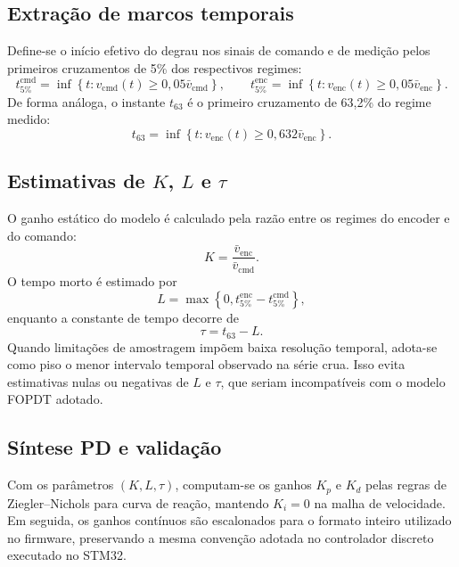 \subsection{Extra\c{c}\~ao de marcos temporais}

Define-se o in\'icio efetivo do degrau nos sinais de comando e de
medi\c{c}\~ao pelos primeiros cruzamentos de 5\% dos respectivos regimes:
\begin{equation}
    t^{\text{cmd}}_{5\%}
    =
    \inf \left\{ t : v_{\text{cmd}}(t) \ge 0{,}05 \bar{v}_{\text{cmd}} \right\},
    \qquad
    t^{\text{enc}}_{5\%}
    =
    \inf \left\{ t : v_{\text{enc}}(t) \ge 0{,}05 \bar{v}_{\text{enc}} \right\}.
\end{equation}
De forma an\'aloga, o instante $t_{63}$ \'e o primeiro cruzamento de
63,2\% do regime medido:
\begin{equation}
    t_{63}
    =
    \inf \left\{ t : v_{\text{enc}}(t) \ge 0{,}632 \bar{v}_{\text{enc}} \right\}.
\end{equation}

\subsection{Estimativas de $K$, $L$ e $\tau$}

O ganho est\'atico do modelo \'e calculado pela raz\~ao entre os regimes
do encoder e do comando:
\begin{equation}
    K = \frac{\bar{v}_{\text{enc}}}{\bar{v}_{\text{cmd}}}.
\end{equation}
O tempo morto \'e estimado por
\begin{equation}
    L = \max\left\{ 0, t^{\text{enc}}_{5\%} - t^{\text{cmd}}_{5\%} \right\},
\end{equation}
enquanto a constante de tempo decorre de
\begin{equation}
    \tau = t_{63} - L.
\end{equation}
Quando limita\c{c}\~oes de amostragem imp\~oem baixa resolu\c{c}\~ao
temporal, adota-se como piso o menor intervalo temporal observado na
s\'erie crua. Isso evita estimativas nulas ou negativas de $L$ e $\tau$,
que seriam incompat\'iveis com o modelo FOPDT adotado.

\subsection{S\'intese PD e valida\c{c}\~ao}

Com os par\^ametros $(K,L,\tau)$, computam-se os ganhos $K_p$ e $K_d$
pelas regras de Ziegler--Nichols para curva de rea\c{c}\~ao, mantendo
$K_i = 0$ na malha de velocidade. Em seguida, os ganhos cont\'inuos s\~ao
escalonados para o formato inteiro utilizado no firmware, preservando a
mesma conven\c{c}\~ao adotada no controlador discreto executado no STM32.

